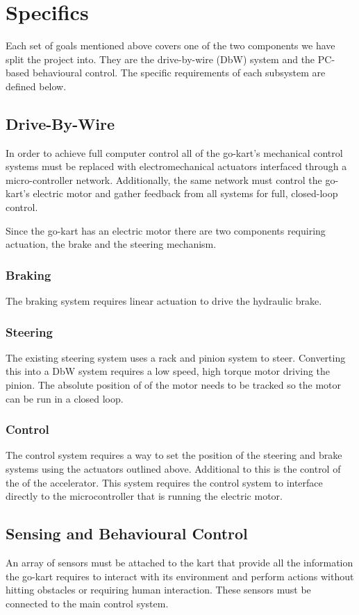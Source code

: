 \section{Specifics}
Each set of goals mentioned above covers one of the two components we have split the project into. They are the drive-by-wire (DbW) system and the PC-based behavioural control. The specific requirements of each subsystem are defined below.

\subsection{Drive-By-Wire}
In order to achieve full computer control all of the go-kart's mechanical control systems must be replaced with electromechanical actuators interfaced through a micro-controller network. Additionally, the same network must control the go-kart's electric motor and gather feedback from all systems for full, closed-loop control.

Since the go-kart has an electric motor there are two components requiring actuation, the brake and the steering mechanism.

\subsubsection{Braking}
The braking system requires linear actuation to drive the hydraulic  brake. 

\subsubsection{Steering}
The existing steering system uses a rack and pinion system to steer. Converting this into a DbW system requires a low speed, high torque motor driving the pinion. The absolute position of of the motor needs to be tracked so the motor can be run in a closed loop.

\subsubsection{Control}
The control system requires a way to set the position of the steering and brake systems using the actuators outlined above. Additional to this is the control of the of the accelerator. This system requires the control system to interface directly to the microcontroller that is running the electric motor.

\subsection{Sensing and Behavioural Control}
An array of sensors must be attached to the kart that provide all the information the go-kart requires to interact with its environment and perform actions without hitting obstacles or requiring human interaction. These sensors must be connected to the main control system. 


